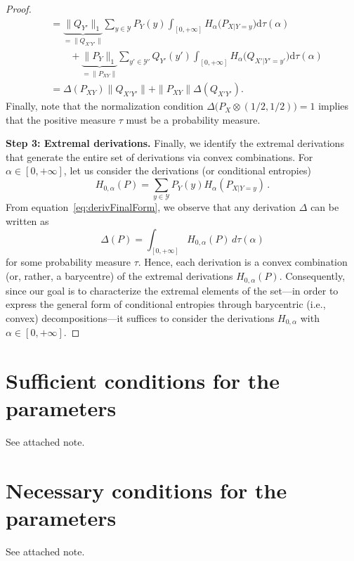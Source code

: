 \documentclass[aps,pra,11pt,onecolumn,nofootinbib,tightenlines]{revtex4-2}
\theoremstyle{definition}
\def \d {\mathrm{d}}
\newcommand{\Y}{\mathcal{Y}}
\newcommand{\mc}[1]{\mathcal{#1}}
\begin{document}
\begin{proof}
\begin{align}
&=\underbrace{\|Q_{Y'}\|_1}_{=\|Q_{X'Y'}\|}\sum_{y\in \Y}P_Y(y)\int_{[0,+\infty]}H_\alpha\big(P_{X|Y=y}\big)\d\tau(\alpha)\\
&\qquad +\underbrace{\|P_Y\|_1}_{=\|P_{XY}\|}\sum_{y'\in \Y'}Q_{Y'}(y')\int_{[0,+\infty]}H_\alpha\big(Q_{X'|Y'=y'}\big)\d\tau(\alpha)\\
&=\Delta(P_{XY})\|Q_{X'Y'}\|+\|P_{XY}\|\Delta(Q_{X'Y'}).
\end{align}
Finally, note that the normalization condition $\Delta\big(P_X\otimes(1/2,1/2)\big)=1$ implies that the positive measure $\tau$ must be a probability measure.


\medskip
\noindent \noindent\textbf{Step 3: Extremal derivations.} Finally, we identify the extremal derivations that generate the entire set of derivations via convex combinations. For $\alpha\in[0,+\infty]$, let us consider the derivations (or conditional entropies)
\begin{equation}\label{eq:ExtDerivation proof}
H_{0,\alpha}(P)=\sum_{y\in\mc Y} P_Y(y)H_\alpha(P_{X|Y=y})\,.
\end{equation}
From equation~\eqref{eq:derivFinalForm}, we observe that any derivation \(\Delta\) can be written as
\begin{equation}
    \Delta(P) = \int_{[0,+\infty]} H_{0,\alpha}(P)\, d\tau(\alpha)
\end{equation}
for some probability measure \(\tau\). Hence, each derivation is a convex combination (or, rather, a barycentre) of the extremal derivations \(H_{0,\alpha}(P)\).
Consequently, since our goal is to characterize the extremal elements of the set—in order to express the general form of conditional entropies through barycentric (i.e., convex) decompositions—it suffices to consider the derivations
\(H_{0,\alpha}\) with \(\alpha \in [0,+\infty]\).
\end{proof}


\section{Sufficient conditions for the parameters}
\label{sec: sufficient conditions measure}
See attached note.

\section{Necessary conditions for the parameters}
\label{sec: necessary conditions measures}
See attached note.
\end{document}
